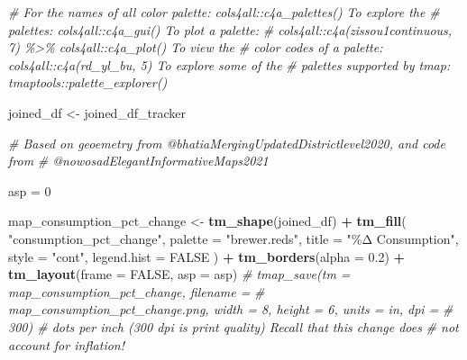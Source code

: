 \documentclass[
]{article}
\newenvironment{Shaded}{\begin{snugshade}}{\end{snugshade}}
\newcommand{\AttributeTok}[1]{\textcolor[rgb]{0.13,0.29,0.53}{#1}}
\newcommand{\CommentTok}[1]{\textcolor[rgb]{0.56,0.35,0.01}{\textit{#1}}}
\newcommand{\ConstantTok}[1]{\textcolor[rgb]{0.56,0.35,0.01}{#1}}
\newcommand{\DecValTok}[1]{\textcolor[rgb]{0.00,0.00,0.81}{#1}}
\newcommand{\FloatTok}[1]{\textcolor[rgb]{0.00,0.00,0.81}{#1}}
\newcommand{\FunctionTok}[1]{\textcolor[rgb]{0.13,0.29,0.53}{\textbf{#1}}}
\newcommand{\NormalTok}[1]{#1}
\newcommand{\OtherTok}[1]{\textcolor[rgb]{0.56,0.35,0.01}{#1}}
\newcommand{\SpecialCharTok}[1]{\textcolor[rgb]{0.81,0.36,0.00}{\textbf{#1}}}
\newcommand{\StringTok}[1]{\textcolor[rgb]{0.31,0.60,0.02}{#1}}
\begin{document}
\begin{Shaded}
\begin{Highlighting}[]
\CommentTok{\# For the names of all color palette: cols4all::c4a\_palettes() To explore the}
\CommentTok{\# palettes: cols4all::c4a\_gui() To plot a palette:}
\CommentTok{\# cols4all::c4a(\textquotesingle{}zissou1continuous\textquotesingle{}, 7) \%\textgreater{}\% cols4all::c4a\_plot() To view the}
\CommentTok{\# color codes of a palette: cols4all::c4a(\textquotesingle{}rd\_yl\_bu\textquotesingle{}, 5) To explore some of the}
\CommentTok{\# palettes supported by tmap: tmaptools::palette\_explorer()}

\NormalTok{joined\_df }\OtherTok{\textless{}{-}}\NormalTok{ joined\_df\_tracker}


\CommentTok{\# Based on geoemetry from @bhatiaMergingUpdatedDistrictlevel2020, and code from}
\CommentTok{\# @nowosadElegantInformativeMaps2021}

\NormalTok{asp }\OtherTok{=} \DecValTok{0}

\NormalTok{map\_consumption\_pct\_change }\OtherTok{\textless{}{-}} \FunctionTok{tm\_shape}\NormalTok{(joined\_df) }\SpecialCharTok{+}
    \FunctionTok{tm\_fill}\NormalTok{(}
        \StringTok{"consumption\_pct\_change"}\NormalTok{, }\AttributeTok{palette =} \StringTok{"brewer.reds"}\NormalTok{,}
        \AttributeTok{title =} \StringTok{"\%Δ Consumption"}\NormalTok{, }\AttributeTok{style =} \StringTok{"cont"}\NormalTok{, }\AttributeTok{legend.hist =} \ConstantTok{FALSE}
\NormalTok{    ) }\SpecialCharTok{+}
    \FunctionTok{tm\_borders}\NormalTok{(}\AttributeTok{alpha =} \FloatTok{0.2}\NormalTok{) }\SpecialCharTok{+}
    \FunctionTok{tm\_layout}\NormalTok{(}\AttributeTok{frame =} \ConstantTok{FALSE}\NormalTok{, }\AttributeTok{asp =}\NormalTok{ asp)}
\CommentTok{\# tmap\_save(tm = map\_consumption\_pct\_change, filename =}
\CommentTok{\# \textquotesingle{}map\_consumption\_pct\_change.png\textquotesingle{}, width = 8, height = 6, units = \textquotesingle{}in\textquotesingle{}, dpi =}
\CommentTok{\# 300) \# dots per inch (300 dpi is print quality) Recall that this change does}
\CommentTok{\# not account for inflation!}


\end{Highlighting}
\end{Shaded}
\end{document}
